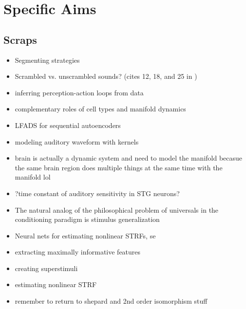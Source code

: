 
% 

\section{Specific Aims}

\begin{multicols}{2}

\subsection{Scraps}


\begin{itemize}
\item Segmenting strategies \citep{ashwoodMiceAlternateDiscrete2020}
\item Scrambled vs. unscrambled sounds? (cites 12, 18, and 25 in \citep{norman-haignereHierarchicalIntegrationMultiple2020})
\item inferring perception-action loops from data \citep{rosasCausalBlanketsTheory2020}
\item complementary roles of cell types and manifold dynamics \citep{dubreuilComplementaryRolesDimensionality2020}
\item LFADS for sequential autoencoders \citep{pandarinathInferringSingletrialNeural2018}
\item modeling auditory waveform with kernels \citep{smithEfficientAuditoryCoding2006a}
\item brain is actually a dynamic system and need to model the manifold \citep{brembsBrainDynamicallyActive2020} becasue the same brain region does multiple things at the same time with the manifold lol \citep{gallegoCorticalPopulationActivity2018}
\item ?time constant of auditory sensitivity in STG neurons?
\item The natural analog of the philosophical problem of universals in the conditioning paradigm is stimulus generalization \citep{roschWittgensteinCategorizationResearch1987}	
\item Neural nets for estimating nonlinear STRFs, se \citep{kingRecentAdvancesUnderstanding2018a}
\item extracting maximally informative features \citep{liuOptimalFeaturesAuditory2019}
\item creating superstimuli \citep{decharmsOptimizingSoundFeatures1998}
\item estimating nonlinear STRF\citep{ahrensNonlinearitiesContextualInfluences2008}
\item remember to return to shepard and 2nd order isomorphism stuff


\end{itemize}
\end{multicols}
